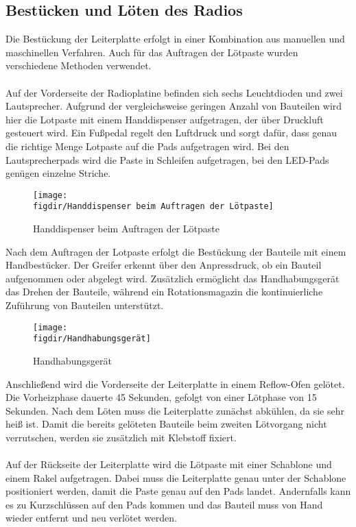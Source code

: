 \subsection{Bestücken und Löten des Radios}
Die Bestückung der Leiterplatte erfolgt in einer Kombination aus manuellen und maschinellen Verfahren.
Auch für das Auftragen der Lötpaste wurden verschiedene Methoden verwendet.\\
\\
Auf der Vorderseite der Radioplatine befinden sich sechs Leuchtdioden und zwei Lautsprecher.
Aufgrund der vergleichsweise geringen Anzahl von Bauteilen wird hier die Lotpaste mit einem Handdispenser aufgetragen, der über Druckluft gesteuert wird.
Ein Fußpedal regelt den Luftdruck und sorgt dafür, dass genau die richtige Menge Lotpaste auf die Pads aufgetragen wird.
Bei den Lautsprecherpads wird die Paste in Schleifen aufgetragen, bei den LED-Pads genügen einzelne Striche.

\begin{figure}[h!]
    \centering
    \texttt{[image: \\figdir/Handdispenser beim Auftragen der Lötpaste]}
    \caption{Handdispenser beim Auftragen der Lötpaste}
    \label{fig:fig: Abbildung 13}
\end{figure}

\noindent
Nach dem Auftragen der Lotpaste erfolgt die Bestückung der Bauteile mit einem Handbestücker.
Der Greifer erkennt über den Anpressdruck, ob ein Bauteil aufgenommen oder abgelegt wird.
Zusätzlich ermöglicht das Handhabungsgerät das Drehen der Bauteile, während ein Rotationsmagazin die kontinuierliche Zuführung von Bauteilen unterstützt.

\begin{figure}[h!]
    \centering
    \texttt{[image: \\figdir/Handhabungsgerät]}
    \caption{Handhabungsgerät}
    \label{fig:fig: Abbildung 14}
\end{figure}

\noindent
Anschließend wird die Vorderseite der Leiterplatte in einem Reflow-Ofen gelötet.
Die Vorheizphase dauerte 45 Sekunden, gefolgt von einer Lötphase von 15 Sekunden. Nach dem Löten muss die Leiterplatte zunächst abkühlen, da sie sehr heiß ist.
Damit die bereits gelöteten Bauteile beim zweiten Lötvorgang nicht verrutschen, werden sie zusätzlich mit Klebstoff fixiert.\\
\\
Auf der Rückseite der Leiterplatte wird die Lötpaste mit einer Schablone und einem Rakel aufgetragen.
Dabei muss die Leiterplatte genau unter der Schablone positioniert werden, damit die Paste genau auf den Pads landet.
Andernfalls kann es zu Kurzschlüssen auf den Pads kommen und das Bauteil muss von Hand wieder entfernt und neu verlötet werden.

